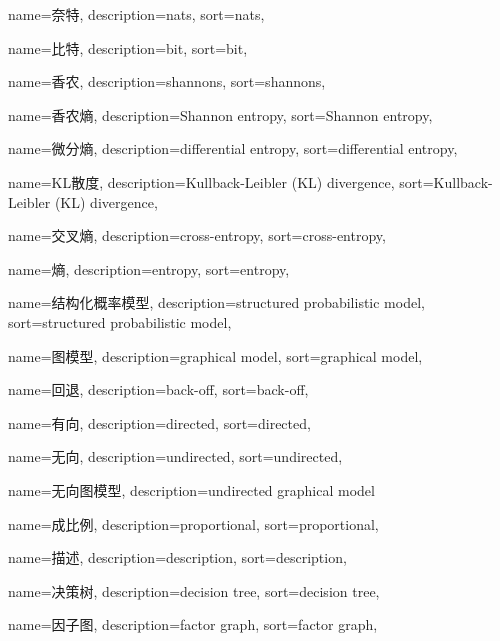 {
  name=奈特,
  description={nats},
  sort={nats},
}

{
  name=比特,
  description={bit},
  sort={bit},
}

{
  name=香农,
  description={shannons},
  sort={shannons},
}

{
  name=香农熵,
  description={Shannon entropy},
  sort={Shannon entropy},
}

{
  name=微分熵,
  description={differential entropy},
  sort={differential entropy},
}

{
  name=KL散度,
  description={Kullback-Leibler (KL) divergence},
  sort={Kullback-Leibler (KL) divergence},
}

{
  name=交叉熵,
  description={cross-entropy},
  sort={cross-entropy},
}

{
	name=熵,
	description={entropy},
	sort={entropy},
}

{
  name=结构化概率模型,
  description={structured probabilistic model},
  sort={structured probabilistic model},
}

{
  name=图模型,
  description={graphical model},
  sort={graphical model},
}

{
  name=回退,
  description={back-off},
  sort={back-off},
}

{
  name=有向,
  description={directed},
  sort={directed},
}

{
  name=无向,
  description={undirected},
  sort={undirected},
}

{
  name=无向图模型,
  description={undirected graphical model}
}

{
  name=成比例,
  description={proportional},
  sort={proportional},
}

{
  name=描述,
  description={description},
  sort={description},
}

{
  name=决策树,
  description={decision tree},
  sort={decision tree},
}

{
  name=因子图,
  description={factor graph},
  sort={factor graph},
}


